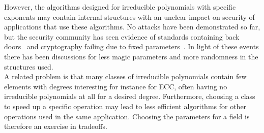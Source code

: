 However, the algorithms designed for irreducible polynomials with specific exponents may contain internal structures with an unclear impact on security of applications that use these algorithms. No attacks have been demonstrated so far, but the security community has seen evidence of standards containing back doors~\cite{bernstein2016dual} and cryptography failing due to fixed parameters~\cite{adrian2015imperfect}. In light of these events there has been discussions for less magic parameters and more randomness in the structures used.\\

A related problem is that many classes of irreducible polynomials contain few elements with degrees interesting for instance for ECC, often having no irreducible polynomials at all for a desired degree. Furthermore, choosing a class to speed up a specific operation may lead to less efficient algorithms for other operations used in the same application. Choosing the parameters for a field is therefore an exercise in tradeoffs.




